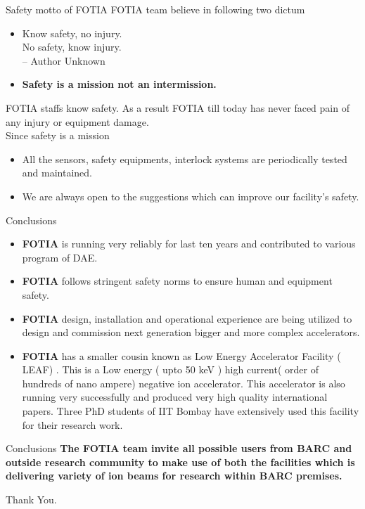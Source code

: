 \documentclass[11pt]{beamer}
\begin{document}
\begin{frame}{Safety motto of FOTIA}
FOTIA team believe in following two dictum
\begin{itemize}
\item Know safety, no injury.\\
     No safety, know injury. \\
      -- Author Unknown			
\item \textbf{Safety is a mission not an intermission.} 
\end{itemize} 

FOTIA staffs know safety. As a result FOTIA till today has never faced pain of any injury or equipment damage.\\
Since safety is a mission 
\begin{itemize}
\item 	All the sensors, safety equipments, interlock systems are periodically tested and maintained.
\item 	We are always open to the suggestions which can improve our facility's safety.	
 
\end{itemize} 

\end{frame}



\begin{frame}{Conclusions}
\begin{itemize}

\item \textbf{FOTIA} is running very reliably for last ten years and contributed to various program of DAE.

\item \textbf{FOTIA} follows stringent safety norms to ensure human and equipment safety.

\item \textbf{FOTIA} design, installation and operational experience are being utilized to design and commission next generation bigger and more complex accelerators.

\item \textbf{FOTIA} has a smaller cousin known as Low Energy Accelerator Facility ( LEAF) . This is a Low energy ( upto 50 keV ) high current( order of hundreds of nano ampere) negative ion accelerator. This accelerator is also running very successfully and produced very high quality international papers. Three PhD students of IIT Bombay have extensively used this facility for their research work.



\end{itemize}
\end{frame}

\begin{frame}{Conclusions}
 \textbf{The FOTIA team invite all possible users from BARC and outside research community to make use of both the facilities which is delivering variety of ion beams for research within BARC premises.}\\
 
 \begin{center}
  \huge {Thank You.}
\end{center}
\end{frame}
\end{document}

